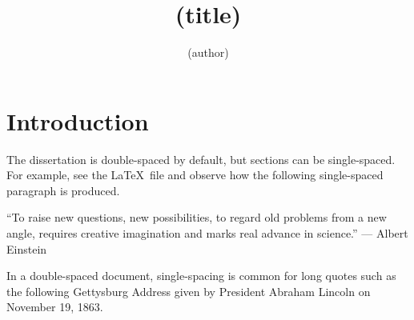 \documentclass[11pt]{report}
\begin{document}
\title     {(title)}
\author    {(author)}





\beginpreface
{}
\endpreface


\chapter{Introduction}

The dissertation is double-spaced by default, but sections can be single-spaced.  For example, see the \LaTeX\ file and observe how the following single-spaced paragraph is produced.

\begin{singlespace}
  ``To raise new questions, new possibilities, to regard old problems from a new angle, requires creative imagination and marks real advance in science.'' --- Albert Einstein
  \end{singlespace}

In a double-spaced document, single-spacing is common for long quotes such as the following Gettysburg Address given by President Abraham Lincoln on November 19, 1863.
\end{document}
